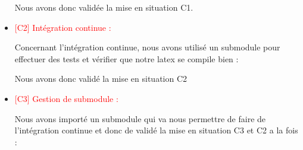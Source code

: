 \begin{itemize}

    Nous avons donc validée la mise en situation C1.
    
    \item \textcolor{red}{[C2] Intégration continue : }

    Concernant l'intégration continue, nous avons utilisé un submodule pour effectuer des tests et vérifier que notre latex se compile bien : 



    Nous avons donc validé la mise en situation C2
    
    \item \textcolor{red}{[C3] Gestion de submodule : }

    Nous avons importé un submodule qui va nous permettre de faire de l'intégration continue et donc de validé la mise en situation C3 et C2 a la fois :
    \\



\end{itemize}
